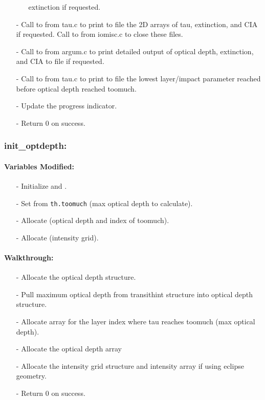 \documentclass[letterpaper,12pt]{article}
\begin{document}
\begin{enumerate}[leftmargin=10pt, noitemsep, parsep=0pt, topsep=0ex]
\begin{enumerate}[leftmargin=10pt, noitemsep, parsep=0pt, topsep=0ex]
    extinction if requested.
\end{enumerate}
\item[-] Call to  from tau.c to print to file the 2D arrays of tau, extinction, and CIA if requested. Call to  from iomisc.c to close these files.
\item[-] Call to  from argum.c to print detailed output of optical depth, extinction, and CIA to file if requested.
\item[-] Call to  from tau.c to print to file the lowest layer/impact parameter reached before
  optical depth reached toomuch.
\item[-] Update the progress indicator.
\item[-] Return 0 on success.
\end{enumerate}


\subsubsection{init\_optdepth:}
\paragraph{Variables Modified:}
\begin{enumerate}[leftmargin=10pt, noitemsep, parsep=0pt, topsep=0ex]
\item[-] Initialize  and .
\item[-] Set  from {\tt th.toomuch} (max
  optical depth to calculate).
\item[-] Allocate  (optical depth and
  index of toomuch).
\item[-] Allocate  (intensity grid).
\end{enumerate}

\paragraph{Walkthrough:}
\begin{enumerate}[leftmargin=10pt, noitemsep, parsep=0pt, topsep=0ex]
\item[-] Allocate the optical depth structure.
\item[-] Pull maximum optical depth from transithint structure into optical depth structure.
\item[-] Allocate array for the layer index where tau reaches toomuch (max optical depth).
\item[-] Allocate the optical depth array
\item[-] Allocate the intensity grid structure and intensity array if using eclipse geometry.
\item[-] Return 0 on success.
\end{enumerate}
\end{document}

